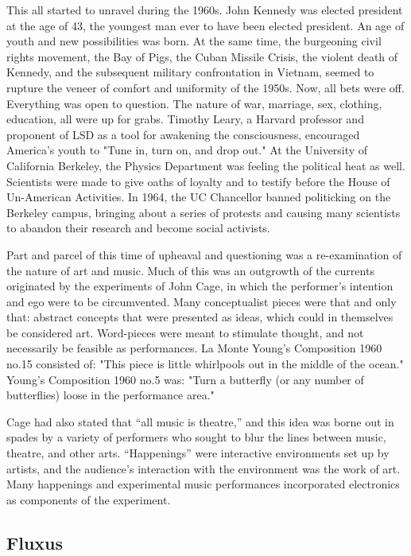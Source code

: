 This all started to unravel during the 1960s. John Kennedy was elected president at the age of 43, the youngest man ever to have been elected president. An age of youth and new possibilities was born. At the same time, the burgeoning civil rights movement, the Bay of Pigs, the Cuban Missile Crisis, the violent death of Kennedy, and the subsequent military confrontation in Vietnam, seemed to rupture the veneer of comfort and uniformity of the 1950s. Now, all bets were off. Everything was open to question. The nature of war, marriage, sex, clothing, education, all were up for grabs. Timothy Leary, a Harvard professor and proponent of LSD as a tool for awakening the consciousness, encouraged America's youth to "Tune in, turn on, and drop out." At the University of California Berkeley, the Physics Department was feeling the political heat as well. Scientists were made to give oaths of loyalty and to testify before the House of Un-American Activities. In 1964, the UC Chancellor banned politicking on the Berkeley campus, bringing about a series of protests and causing many scientists to abandon their research and become social activists.

Part and parcel of this time of upheaval and questioning was a re-examination of the nature of art and music. Much of this was an outgrowth of the currents originated by the experiments of John Cage, in which the performer's intention and ego were to be circumvented.
Many conceptualist pieces were that and only that: abstract concepts that were presented as ideas, which could in themselves be considered art. Word-pieces were meant to stimulate thought, and not necessarily be feasible as performances. La Monte Young's Composition 1960 no.15 consisted of: "This piece is little whirlpools out in the middle of the ocean." Young's Composition 1960 no.5 was: "Turn a butterfly (or any number of butterflies) loose in the performance area."

Cage had also stated that ``all music is theatre,'' and this idea was borne out in spades by a variety of performers who sought to blur the lines between music, theatre, and other arts. ``Happenings'' were interactive environments set up by artists, and the audience's interaction with the environment was the work of art. Many happenings and experimental music performances incorporated electronics as components of the experiment.

\subsection{Fluxus}

